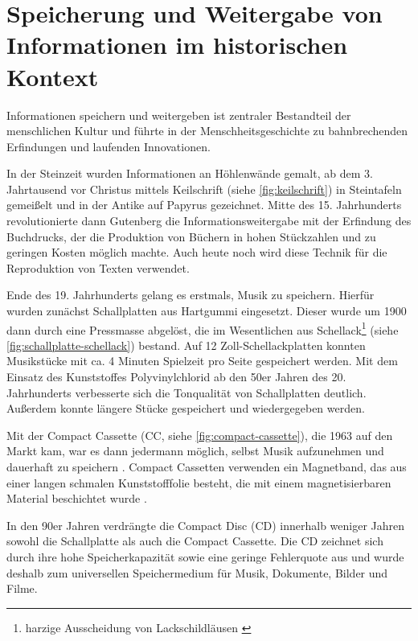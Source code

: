 \section{Speicherung und Weitergabe von Informationen im historischen Kontext}
\label{sec:einleitung}

Informationen speichern und weitergeben ist zentraler Bestandteil der
menschlichen Kultur und führte in der Menschheitsgeschichte zu bahnbrechenden
Erfindungen und laufenden Innovationen.

In der Steinzeit wurden Informationen an Höhlenwände gemalt, ab dem 3.
Jahrtausend vor Christus mittels Keilschrift (siehe \autoref{fig:keilschrift})
in Steintafeln gemeißelt und in der Antike auf Papyrus gezeichnet. Mitte des 15.
Jahrhunderts revolutionierte dann Gutenberg die Informationsweitergabe mit der
Erfindung des Buchdrucks, der die Produktion von Büchern in hohen Stückzahlen
und zu geringen Kosten möglich machte. Auch heute noch wird diese Technik für
die Reproduktion von Texten verwendet.

Ende des 19. Jahrhunderts gelang es erstmals, Musik zu speichern. Hierfür wurden
zunächst Schallplatten aus Hartgummi eingesetzt. Dieser wurde um 1900 dann durch
eine Pressmasse abgelöst, die im Wesentlichen aus Schellack\footnote{harzige
Ausscheidung von Lackschildläusen \cite{schellack}} (siehe
\autoref{fig:schallplatte-schellack}) bestand. Auf 12 Zoll-Schellackplatten
konnten Musikstücke mit ca. 4 Minuten Spielzeit pro Seite gespeichert werden.
Mit dem Einsatz des Kunststoffes Polyvinylchlorid ab den 50er Jahren des 20.
Jahrhunderts verbesserte sich die Tonqualität von Schallplatten deutlich.
Außerdem konnte längere Stücke gespeichert und wiedergegeben werden.
\cite{schallplatte1}

Mit der Compact Cassette (CC, siehe \autoref{fig:compact-cassette}), die 1963
auf den Markt kam, war es dann jedermann möglich, selbst Musik aufzunehmen und
dauerhaft zu speichern \cite{kassette1}. Compact Cassetten verwenden ein
Magnetband, das aus einer langen schmalen Kunststofffolie besteht, die mit einem
magnetisierbaren Material beschichtet wurde \cite{kassette2}.

In den 90er Jahren verdrängte  die Compact Disc (CD) innerhalb weniger Jahren
sowohl die Schallplatte als auch die Compact Cassette. Die CD zeichnet sich
durch ihre hohe Speicherkapazität sowie eine geringe Fehlerquote aus und wurde
deshalb zum universellen Speichermedium für Musik, Dokumente, Bilder und Filme.
\cite{cd_durchbruch}

